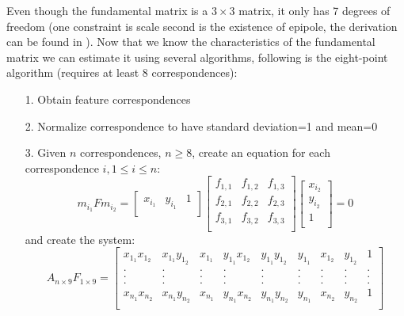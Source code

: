 Even though the fundamental matrix is a $3 \times 3$ matrix, it only has 7 degrees of freedom (one constraint is scale second is the existence of epipole, the derivation can be found in \cite{book:multiple_view_geometry}). Now that we know the characteristics of the fundamental matrix we can estimate it using several algorithms, following is the eight-point algorithm \cite{cvfx, elements-of-computer-vision, book:multiple_view_geometry} (requires at least 8 correspondences):
\begin{itemize}
	\item[1.] Obtain feature correspondences 
	\item[2.] Normalize correspondence to have standard deviation=1 and mean=0
	\item[3.] Given $n$ correspondences, $n \geq 8$, create an equation for each correspondence $i, 1 \leq i \leq n$:
	\begin{equation}
		m_{i_1} F m_{i_2} = 
		\begin{bmatrix}
			x_{i_1} & y_{i_1} & 1 \\
		\end{bmatrix}
		\begin{bmatrix}
			f_{1,1} & f_{1,2} & f_{1,3} \\
			f_{2,1} & f_{2,2} & f_{2,3} \\
			f_{3,1} & f_{3,2} & f_{3,3} \\
		\end{bmatrix}
		\begin{bmatrix}
			x_{i_2} \\
			y_{i_2} \\
			1 \\
		\end{bmatrix}
		= 0
	\end{equation}
	and create the system:
	\begin{equation}
		A_{n \times 9}F_{1 \times 9}=
		\begin{bmatrix}
			x_{1_1} x_{1_2} & x_{1_1} y_{1_2}  & x_{1_1}  & y_{1_1} x_{1_2} & y_{1_1} y_{1_2}  & y_{1_1}  & x_{1_2} & y_{1_2}  & 1 \\
			. & . & . & . & . & . & . & . & .\\
			. & . & . & . & . & . & . & . & .\\
			. & . & . & . & . & . & . & . & .\\
			x_{n_1} x_{n_2} & x_{n_1} y_{n_2}  & x_{n_1}  & y_{n_1} x_{n_2} & y_{n_1} y_{n_2}  & y_{n_1}  & x_{n_2} & y_{n_2}  & 1 \\
		\end{bmatrix}

\end{equation}
\end{itemize}
